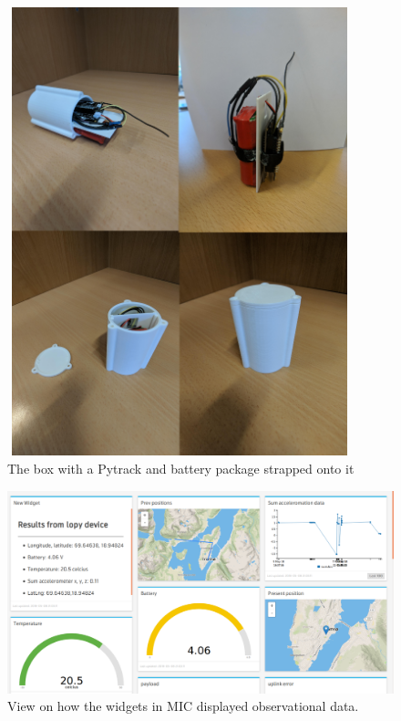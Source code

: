 \newpage
\begin{appendices}
\renewcommand\thefigure{\thesection.\arabic{figure}}    
\setcounter{figure}{0}  
\begin{figure}[h]
	\caption{The box with a Pytrack and battery package strapped onto it}
	\includegraphics[width=10cm, height=13cm]{box}
\end{figure}
\begin{figure}[h]
	\caption{View on how the widgets in MIC displayed observational data.}
	\includegraphics[scale=0.3]{miccloud.pdf}
\end{figure}


\end{appendices}
